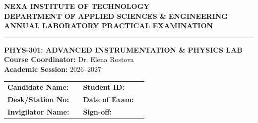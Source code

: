 \begin{center}
    \sffamily
    \vspace*{1.0cm}
    {\large\bfseries\color{accent}NEXA INSTITUTE OF TECHNOLOGY} \\[0.4em]
    {\large\bfseries\color{primary!80}DEPARTMENT OF APPLIED SCIENCES \& ENGINEERING} \\
    \vspace{1.5cm}
    {\Huge\bfseries\color{primary}ANNUAL LABORATORY PRACTICAL EXAMINATION} \\
    \vspace{0.8cm}
    {\large\color{secondary}\hrule height 2pt}
    \vspace{0.8cm}
    {\LARGE\bfseries\color{secondary}PHYS-301: ADVANCED INSTRUMENTATION \& PHYSICS LAB} \\
    \vspace{0.5cm}
    {\large\color{primary!75}\textbf{Course Coordinator:} Dr. Elena Rostova} \\
    \vspace{0.3cm}
    {\large\color{primary!75}\textbf{Academic Session:} 2026--2027} \\
\end{center}

\vspace{1.2cm}

\noindent
\begin{tcolorbox}[
    colback=white,
    colframe=primary,
    boxrule=1.2pt,
    arc=4pt,
    title={CANDIDATE AND STATION DETAILS},
    fonttitle=\sffamily\bfseries\color{white},
    coltitle=white,
    colbacktitle=primary,
    left=12pt, right=12pt, top=10pt, bottom=12pt
]
\renewcommand{\arraystretch}{1.6}
\begin{tabularx}{\textwidth}{@{}l X l X@{}}
    \textbf{Candidate Name:} & \hrulefill & \textbf{Student ID:} & \hrulefill \\
    \textbf{Desk/Station No:} & \hrulefill & \textbf{Date of Exam:} & \hrulefill \\
    \textbf{Invigilator Name:} & \hrulefill & \textbf{Sign-off:} & \hrulefill \\
\end{tabularx}
\end{tcolorbox}

\vspace{0.8cm}

